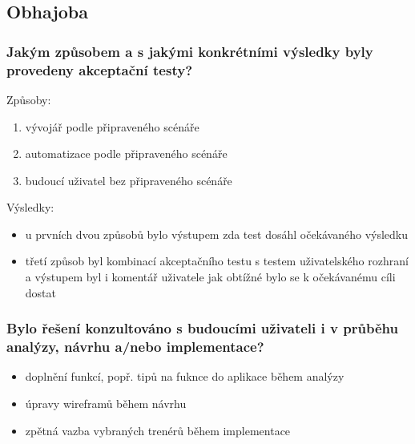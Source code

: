 \documentclass{beamer}
\begin{document}
\subsection{Obhajoba}

\begin{frame}
  \frametitle{Jakým způsobem a s jakými konkrétními výsledky byly provedeny akceptační testy?}

  Způsoby:

  \begin{enumerate}
    \item vývojář podle připraveného scénáře
    \item automatizace podle připraveného scénáře
    \item budoucí uživatel bez připraveného scénáře
  \end{enumerate}

  Výsledky:

  \begin{itemize}
    \item u prvních dvou způsobů bylo výstupem zda test dosáhl očekávaného výsledku
    \item třetí způsob byl kombinací akceptačního testu s testem uživatelského rozhraní a výstupem byl i komentář uživatele jak obtížné bylo se k očekávanému cíli dostat
  \end{itemize}

\end{frame}
\begin{frame}
  \frametitle{Bylo řešení konzultováno s budoucími uživateli i v průběhu analýzy, návrhu a/nebo implementace?}

  \begin{itemize}
    \item doplnění funkcí, popř. tipů na fuknce do aplikace během analýzy
    \item úpravy wireframů během návrhu
    \item zpětná vazba vybraných trenérů během implementace
  \end{itemize}
\end{frame}
\end{document}
